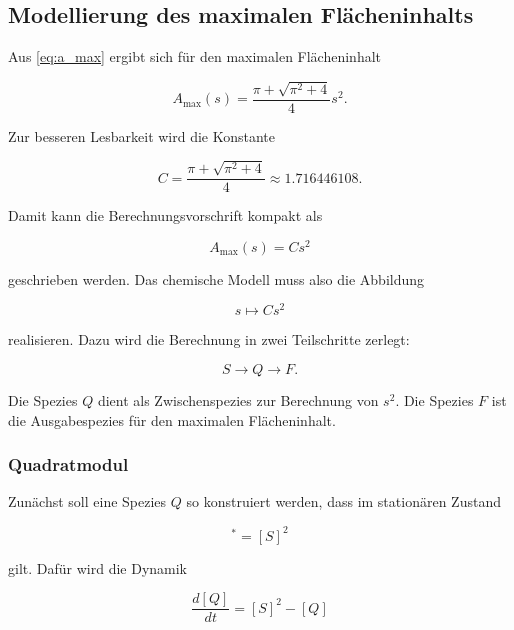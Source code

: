 \subsection{Modellierung des maximalen Flächeninhalts}

Aus \eqref{eq:a_max} ergibt sich für den maximalen Flächeninhalt

\begin{equation}
    A_{\max}(s)
    =
    \frac{\pi+\sqrt{\pi^2+4}}{4}s^2.
\end{equation}

Zur besseren Lesbarkeit wird die Konstante

\begin{equation}
    C
    =
    \frac{\pi+\sqrt{\pi^2+4}}{4}
    \approx 1.716446108.
    \label{eq:C_definition}
\end{equation}

Damit kann die Berechnungsvorschrift kompakt als

\begin{equation}
    A_{\max}(s)=Cs^2
\end{equation}

geschrieben werden. Das chemische Modell muss also die Abbildung

\begin{equation}
    s \mapsto Cs^2
\end{equation}

realisieren. Dazu wird die Berechnung in zwei Teilschritte zerlegt:

\begin{equation}
    S \longrightarrow Q \longrightarrow F.
\end{equation}

Die Spezies \(Q\) dient als Zwischenspezies zur Berechnung von \(s^2\).
Die Spezies \(F\) ist die Ausgabespezies für den maximalen Flächeninhalt.

\subsubsection{Quadratmodul}

Zunächst soll eine Spezies \(Q\) so konstruiert werden, dass im
stationären Zustand

\begin{equation}
    [Q]^*=[S]^2
\end{equation}

gilt. Dafür wird die Dynamik

\begin{equation}
    \frac{d[Q]}{dt}
    =
    [S]^2-[Q]
    \label{eq:Q_dynamik}
\end{equation}

